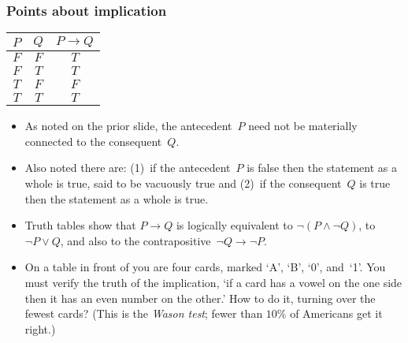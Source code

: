 \documentclass[10pt,t]{beamer}
\begin{document}
\begin{frame}\vspace*{-1ex}
\frametitle{Points about implication}
\begin{center}
  \begin{tabular}{cc|c}
    $P$  &$Q$  &$P \rightarrow Q$  \\ \hline
    $F$  &$F$  &$T$          \\
    $F$  &$T$  &$T$          \\
    $T$  &$F$  &$F$          \\
    $T$  &$T$  &$T$     
  \end{tabular}
\end{center}
\begin{itemize}
\item As noted on the prior slide, 
  the antecedent~$P$ need not be materially connected to the 
  consequent~$Q$.
\pause
\item Also noted there are:
  (1)~if the antecedent~$P$ is false then the statement as a whole is true, 
  said to be \alert{vacuously true}
  and (2)~if the consequent~$Q$ is true then the statement as a whole is true.
\pause
\item Truth tables show that $P\rightarrow Q$
  is logically equivalent to $\neg(P\wedge \neg Q)$, 
  to $\neg P\vee Q$,
  and also to the \alert{contrapositive}~$\neg Q\rightarrow \neg P$.
\pause
\item 
  On a table in front of you are four cards, 
  marked `A', `B', `0', and~`1'.
  You must verify the truth of the implication, 
  `if a card has a vowel on the one side 
  then it has an even number on the other.'  
  How to do it, turning over the fewest cards?
  (This is the \textit{Wason test}; fewer than $10\%$ of Americans 
  get it right.)
\end{itemize}
\end{frame}
\end{document}
